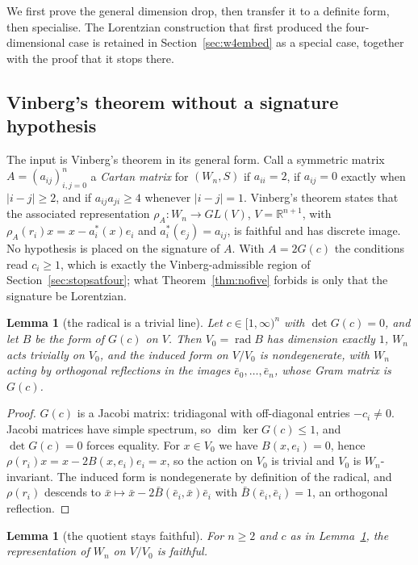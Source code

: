 \documentclass[11pt]{article}
\newtheorem{lemma}[theorem]{Lemma}
\theoremstyle{definition}
\theoremstyle{remark}
\theoremstyle{definition}
\begin{document}
We first prove the general dimension drop, then transfer it to a definite form, then specialise.
The Lorentzian construction that first produced the four-dimensional case is retained in
Section~\ref{sec:w4embed} as a special case, together with the proof that it stops there.

\subsection{Vinberg's theorem without a signature hypothesis}\label{sec:vinbergsetup}
The input is Vinberg's theorem in its general form. Call a symmetric matrix $A=(a_{ij})_{i,j=0}^n$
a \emph{Cartan matrix} for $(W_n,S)$ if $a_{ii}=2$, if $a_{ij}=0$ exactly when $|i-j|\ge2$, and if
$a_{ij}a_{ji}\ge4$ whenever $|i-j|=1$. Vinberg's theorem \cite{vinberg1971} states that the
associated representation $\rho_A\colon W_n\to GL(V)$, $V=\mathbb{R}^{n+1}$, with
$\rho_A(r_i)x=x-a_i^{*}(x)e_i$ and $a_i^{*}(e_j)=a_{ij}$, is faithful and has discrete image. No
hypothesis is placed on the signature of $A$. With $A=2G(c)$ the conditions read $c_i\ge1$, which
is exactly the Vinberg-admissible region of Section~\ref{sec:stopsatfour}; what
Theorem~\ref{thm:nofive} forbids is only that the signature be Lorentzian.

\begin{lemma}[the radical is a trivial line]\label{lem:radline}
Let $c\in[1,\infty)^n$ with $\det G(c)=0$, and let $B$ be the form of $G(c)$ on $V$. Then
$V_0=\operatorname{rad}B$ has dimension exactly $1$, $W_n$ acts trivially on $V_0$, and the induced
form on $V/V_0$ is nondegenerate, with $W_n$ acting by orthogonal reflections in the images
$\bar e_0,\dots,\bar e_n$, whose Gram matrix is $G(c)$.
\end{lemma}

\begin{proof}
$G(c)$ is a Jacobi matrix: tridiagonal with off-diagonal entries $-c_i\ne0$. Jacobi matrices have
simple spectrum, so $\dim\ker G(c)\le1$, and $\det G(c)=0$ forces equality. For $x\in V_0$ we have
$B(x,e_i)=0$, hence $\rho(r_i)x=x-2B(x,e_i)e_i=x$, so the action on $V_0$ is trivial and $V_0$ is
$W_n$-invariant. The induced form is nondegenerate by definition of the radical, and
$\rho(r_i)$ descends to $\bar x\mapsto\bar x-2\bar B(\bar e_i,\bar x)\bar e_i$ with
$\bar B(\bar e_i,\bar e_i)=1$, an orthogonal reflection.
\end{proof}

\begin{lemma}[the quotient stays faithful]\label{lem:quotfaith}
For $n\ge2$ and $c$ as in Lemma~\ref{lem:radline}, the representation of $W_n$ on $V/V_0$ is
faithful.
\end{lemma}
\end{document}
